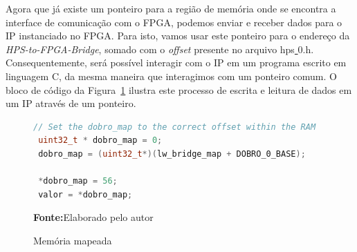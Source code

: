 Agora que já existe um ponteiro para a região de memória onde se encontra a interface de comunicação com o FPGA, podemos enviar e receber dados para o IP instanciado no FPGA\@. Para isto, vamos usar este ponteiro para o endereço da \textit{HPS-to-FPGA-Bridge}, somado com o \textit{offset} presente no arquivo hps\underline{ }0.h.  Consequentemente, será possível interagir com o IP em um programa escrito em linguagem C, da mesma maneira que interagimos com um ponteiro comum. O bloco de código da Figura~\ref{fig:codigomapdobro} ilustra este processo de escrita e leitura de dados em um IP através de um ponteiro.

\begin{figure}[ht]
\caption{Memória mapeada}
\begin{center}
\begin{lstlisting}[language=C++, backgroundcolor=\color{gray!10}]
 // Set the dobro_map to the correct offset within the RAM
 uint32_t * dobro_map = 0;
 dobro_map = (uint32_t*)(lw_bridge_map + DOBRO_0_BASE);

 *dobro_map = 56;
 valor = *dobro_map;
\end{lstlisting}
{\small \textbf{Fonte:}Elaborado pelo autor}	
\end{center}\label{fig:codigomapdobro}
	
\end{figure}
